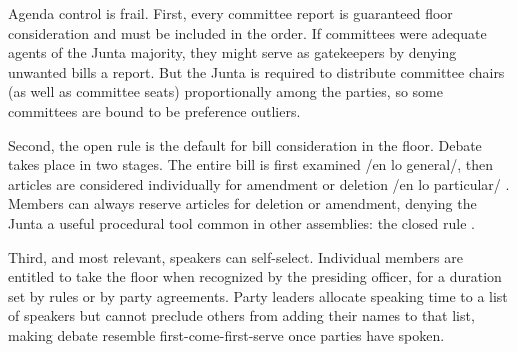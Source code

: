 \documentclass[letter,12pt]{article}
\begin{document}

Agenda control is frail. First, every committee report is guaranteed floor consideration and must be included in the order. If committees were adequate agents of the Junta majority, they might serve as gatekeepers by denying unwanted bills a report. But the Junta is required to distribute committee chairs (as well as committee seats) proportionally among the parties, so some committees are bound to be preference outliers.

Second, the open rule is the default for bill consideration in the floor. Debate takes place in two stages. The entire bill is first examined /en lo general/, then articles are considered individually for amendment or deletion /en lo particular/ \citep[see][]{heller.weldon.nd}. Members can always reserve articles for deletion or amendment, denying the Junta a useful procedural tool common in other assemblies: the closed rule \citep[eg.,][]{cox.2006,dion.huber.1996}.

Third, and most relevant, speakers can self-select. Individual members are entitled to take the floor when recognized by the presiding officer, for a duration set by rules or by party agreements. Party leaders allocate speaking time to a list of speakers but cannot preclude others from adding their names to that list, making debate resemble first-come-first-serve once parties have spoken. 


\end{document}
